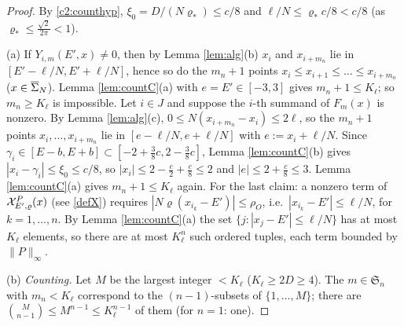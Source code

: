 \begin{proof}
By \eqref{c2:counthyp}, $\xi_0=D/(N\varrho_*)\le c/8$ and $\ell/N\le\varrho_*c/8<c/8$ (as $\varrho_*\le\frac{\sqrt2}{2\pi}<1$).

(a) If $Y_{i,m}(E',x)\ne0$, then by Lemma \ref{lem:alg}(b) $x_i$ and $x_{i+m_n}$ lie in $[E'-\ell/N,E'+\ell/N]$, hence so do the $m_n+1$ points $x_i\le x_{i+1}\le\dots\le x_{i+m_n}$ ($x\in\overline{\Sigma}_N$). Lemma \ref{lem:countC}(a) with $e=E'\in[-3,3]$ gives $m_n+1\le K_\ell$; so $m_n\ge K_\ell$ is impossible.
Let $i\in J$ and suppose the $i$-th summand of $F_m(x)$ is nonzero. By Lemma \ref{lem:alg}(c), $0\le N(x_{i+m_n}-x_i)\le2\ell$, so the $m_n+1$ points $x_i,\dots,x_{i+m_n}$ lie in $[e-\ell/N,e+\ell/N]$ with $e:=x_i+\ell/N$.
Since $\gamma_i\in[E-b,E+b]\subset[-2+\frac38c,2-\frac38c]$, Lemma \ref{lem:countC}(b) gives $|x_i-\gamma_i|\le\xi_0\le c/8$, so $|x_i|\le2-\frac c2+\frac c8\le2$ and $|e|\le2+\frac c8\le3$. Lemma \ref{lem:countC}(a) gives $m_n+1\le K_\ell$ again.
For the last claim: a nonzero term of $\mathcal{X}^P_{E',\varrho}(x)$ (see \eqref{defX}) requires $|N\varrho(x_{i_k}-E')|\le\rho_O$, i.e.\ $|x_{i_k}-E'|\le\ell/N$, for $k=1,\dots,n$. By Lemma \ref{lem:countC}(a) the set $\{j:|x_j-E'|\le\ell/N\}$ has at most $K_\ell$ elements, so there are at most $K_\ell^n$ such ordered tuples, each term bounded by $\|P\|_\infty$.

(b) \emph{Counting.} Let $M$ be the largest integer $<K_\ell$ ($K_\ell\ge2D\ge4$). The $m\in\mathfrak S_n$ with $m_n<K_\ell$ correspond to the $(n-1)$-subsets of $\{1,\dots,M\}$; there are $\binom M{n-1}\le M^{n-1}\le K_\ell^{n-1}$ of them (for $n=1$: one).


\end{proof}
